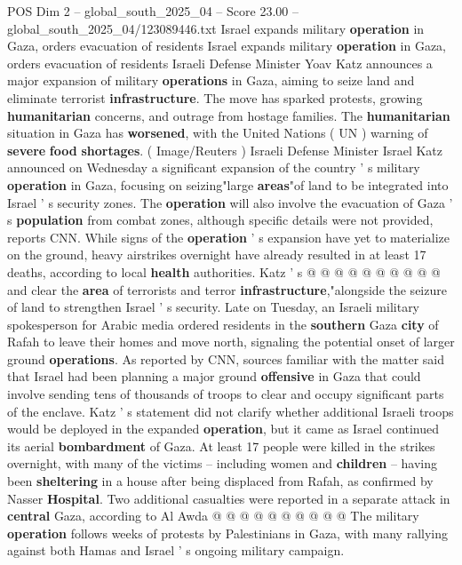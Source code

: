 \begin{textsample}{POS Dim 2 – global\_south\_2025\_04 – Score 23.00 – global\_south\_2025\_04/123089446.txt}  \label{ex:f2_pos_279}
Israel expands military \textbf{operation} in Gaza, orders evacuation of residents Israel expands military \textbf{operation} in Gaza, orders evacuation of residents Israeli Defense Minister Yoav Katz announces a major expansion of military \textbf{operations} in Gaza, aiming to seize land and eliminate terrorist \textbf{infrastructure}.
The move has sparked protests, growing \textbf{humanitarian} concerns, and outrage from hostage families.
The \textbf{humanitarian} situation in Gaza has \textbf{worsened}, with the United Nations ( UN ) warning of \textbf{severe} \textbf{food} \textbf{shortages}. ( Image/Reuters ) Israeli Defense Minister Israel Katz announced on Wednesday a significant expansion of the country ' s military \textbf{operation} in Gaza, focusing on seizing"large \textbf{areas}"of land to be integrated into Israel ' s security zones.
The \textbf{operation} will also involve the evacuation of Gaza ' s \textbf{population} from combat zones, although specific details were not provided, reports CNN.
While signs of the \textbf{operation} ' s expansion have yet to materialize on the ground, heavy airstrikes overnight have already resulted in at least 17 deaths, according to local \textbf{health} authorities.
Katz ' s @ @ @ @ @ @ @ @ @ @ and clear the \textbf{area} of terrorists and terror \textbf{infrastructure},"alongside the seizure of land to strengthen Israel ' s security.
Late on Tuesday, an Israeli military spokesperson for Arabic media ordered residents in the \textbf{southern} Gaza \textbf{city} of Rafah to leave their homes and move north, signaling the potential onset of larger ground \textbf{operations}.
As reported by CNN, sources familiar with the matter said that Israel had been planning a major ground \textbf{offensive} in Gaza that could involve sending tens of thousands of troops to clear and occupy significant parts of the enclave.
Katz ' s statement did not clarify whether additional Israeli troops would be deployed in the expanded \textbf{operation}, but it came as Israel continued its aerial \textbf{bombardment} of Gaza.
At least 17 people were killed in the strikes overnight, with many of the victims -- including women and \textbf{children} -- having been \textbf{sheltering} in a house after being displaced from Rafah, as confirmed by Nasser \textbf{Hospital}.
Two additional casualties were reported in a separate attack in \textbf{central} Gaza, according to Al Awda @ @ @ @ @ @ @ @ @ @ The military \textbf{operation} follows weeks of protests by Palestinians in Gaza, with many rallying against both Hamas and Israel ' s ongoing military campaign.

\end{textsample}
